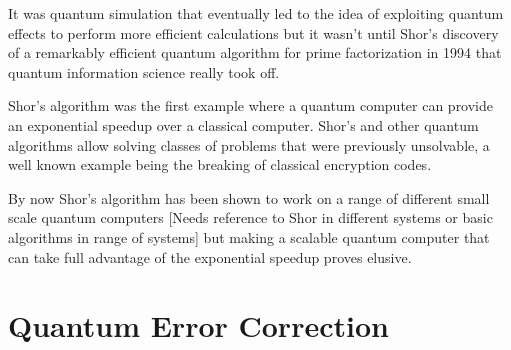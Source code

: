 It was quantum simulation that eventually led to the idea of exploiting quantum effects to perform more efficient calculations but it wasn't until Shor's discovery of a remarkably efficient quantum algorithm for prime factorization in 1994\citep{Shor1994Algorithms} that quantum information science really took off.

Shor's algorithm was the first example where a quantum computer can provide an exponential speedup over a classical computer. Shor's and other quantum algorithms allow solving classes of problems that were previously unsolvable, a well known example being the breaking of classical encryption codes.


By now Shor's algorithm has been shown to work on a range of different small scale quantum computers \cite{Vandersypen2001Experimental} [Needs reference to Shor in different systems or basic algorithms in range of systems] but making a scalable quantum computer that can take full advantage of the exponential speedup proves elusive.




\section{Quantum Error Correction}



